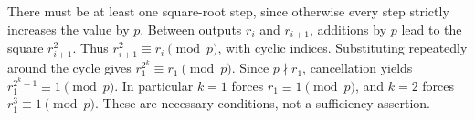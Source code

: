 There must be at least one square-root step, since otherwise every step strictly increases the value by $p$. Between outputs $r_i$ and $r_{i+1}$, additions by $p$ lead to the square $r_{i+1}^2$. Thus $r_{i+1}^2\equiv r_i\pmod p$, with cyclic indices. Substituting repeatedly around the cycle gives $r_1^{2^k}\equiv r_1\pmod p$. Since $p\nmid r_1$, cancellation yields $\boxed{r_1^{2^k-1}\equiv1\pmod p}$. In particular $k=1$ forces $r_1\equiv1\pmod p$, and $k=2$ forces $r_1^3\equiv1\pmod p$. These are necessary conditions, not a sufficiency assertion.
